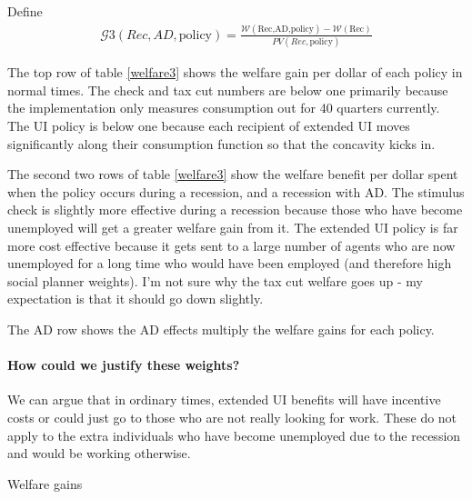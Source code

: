\documentclass[11pt]{article}
\begin{document}
	Define
	\begin{align}
	\mathcal{G}3(Rec,AD,\text{policy}) = \frac{\mathcal{W}(\text{Rec,AD,policy}) - \mathcal{W}(\text{Rec})}{PV(Rec,\text{policy})}
	\end{align}
	
	The top row of table \ref{welfare3} shows the welfare gain per dollar of each policy in normal times. The check and tax cut numbers are below one primarily because the implementation only measures consumption out for 40 quarters currently. The UI policy is below one because each recipient of extended UI moves significantly along their consumption function so that the concavity kicks in.
	
	The second two rows of table \ref{welfare3} show the welfare benefit per dollar spent when the policy occurs during a recession, and a recession with AD. The stimulus check is slightly more effective during a recession because those who have become unemployed will get a greater welfare gain from it. The extended UI policy is far more cost effective because it gets sent to a large number of agents who are now unemployed for a long time who would have been employed (and therefore high social planner weights). I'm not sure why the tax cut welfare goes up - my expectation is that it should go down slightly.
	
	The AD row shows the AD effects multiply the welfare gains for each policy.
	
	\paragraph{How could we justify these weights?}
	We can argue that in ordinary times, extended UI benefits will have incentive costs or could just go to those who are not really looking for work. These do not apply to the extra individuals who have become unemployed due to the recession and would be working otherwise.
	\begin{table} 
	\center
	
	\caption{Welfare gains}
	\label{welfare3}
	\end{table}
	
	
\end{document}
